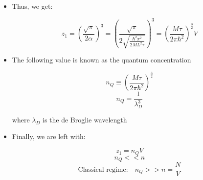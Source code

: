 \begin{itemize}
\begin{itemize}
\begin{itemize}
\begin{itemize}
              \item Thus, we get:

                $$z_1=\left(  \frac{\sqrt{\pi}}{2\alpha}\right)^3=\left( \frac{\sqrt{\pi}}{2\sqrt{\frac{\hbar^2\pi^2}{2ML^2\tau}}} \right)^3=\left(\frac{M\tau}{2\pi\hbar^2}\right)^\frac{3}{2}V$$

              \item The following value is known as the quantum concentration

                $$n_Q\equiv\left( \frac{M\tau}{2\pi\hbar^2} \right)^{\frac{3}{2}}$$
                $$n_Q=\frac{1}{\lambda_D^3}$$

                where $\lambda_D$ is the de Broglie wavelength

              \item Finally, we are left with:

                $$z_1=n_QV$$
                $$n_Q<<n$$
                $$\text{Classical regime:}\quad n_Q>>n=\frac{N}{V}$$

            \end{itemize}

        \end{itemize}

    \end{itemize}

\end{itemize}




